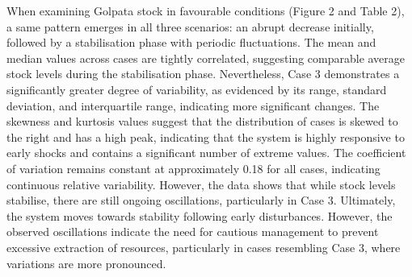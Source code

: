 \documentclass[final,5p,times,twocolumn,authoryear]{elsarticle}
\begin{document}
\begin{table}[htbp]
    \centering
    \caption{Golpata Stock - Statistical Analysis}
\end{table}
When examining Golpata stock in favourable conditions (Figure 2 and Table 2), a same pattern emerges in all three scenarios: an abrupt decrease initially, followed by a stabilisation phase with periodic fluctuations. The mean and median values across cases are tightly correlated, suggesting comparable average stock levels during the stabilisation phase. Nevertheless, Case 3 demonstrates a significantly greater degree of variability, as evidenced by its range, standard deviation, and interquartile range, indicating more significant changes. The skewness and kurtosis values suggest that the distribution of cases is skewed to the right and has a high peak, indicating that the system is highly responsive to early shocks and contains a significant number of extreme values. The coefficient of variation remains constant at approximately 0.18 for all cases, indicating continuous relative variability. However, the data shows that while stock levels stabilise, there are still ongoing oscillations, particularly in Case 3. Ultimately, the system moves towards stability following early disturbances. However, the observed oscillations indicate the need for cautious management to prevent excessive extraction of resources, particularly in cases resembling Case 3, where variations are more pronounced.\\
\end{document}
